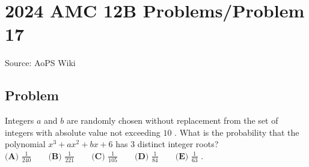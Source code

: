 \documentclass[12pt]{article}
\begin{document}
\section*{{2024 AMC 12B Problems/Problem 17}}
Source: AoPS Wiki

\subsection*{Problem}
Integers $a$ and $b$ are randomly chosen without replacement from the set of integers with absolute value not exceeding $10$ . What is the probability that the polynomial $x^3 + ax^2 + bx + 6$ has $3$ distinct integer roots? $\textbf{(A) } \frac{1}{240} \qquad \textbf{(B) } \frac{1}{221} \qquad \textbf{(C) } \frac{1}{105} \qquad \textbf{(D) } \frac{1}{84} \qquad \textbf{(E) } \frac{1}{63}$ .
\end{document}

